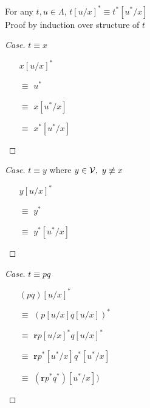 \begin{prop}
  For any $t, u\in\Lambda$, $t[u/x]^* \equiv t^*[u^*/x]$\\
  Proof by induction over structure of $t$
  \begin{proof}[Case]
    $t\equiv x$
    \begin{itemize}
      \item[\phantom{$\equiv$}] $x[u/x]^*$

      \item[$\equiv$] $u^*$

        \item[$\equiv$] $x[u^*/x]$

        \item[$\equiv$] $x^*[u^*/x]$
          \marginnote{\Def-$(-)^*$}
          \qedhere
    \end{itemize}
  \end{proof}

  \begin{proof}[Case]
    $t\equiv y$ where $y\in\mathcal{V},~y\not\equiv x$
    \begin{itemize}
      \item[\phantom{$\equiv$}] $y[u/x]^*$
      \item[$\equiv$] $y^*$
      \item[$\equiv$] $y^*[u^*/x]$
          \qedhere
    \end{itemize}
  \end{proof}

  \begin{proof}[Case]
    $t\equiv pq$
    \begin{itemize}
      \item[\phantom{$\equiv$}] $(pq)[u/x]^*$

      \item[$\equiv$] $(p[u/x]q[u/x])^*$

      \item[$\equiv$] $\mathbf{r}p[u/x]^*q[u/x]^*$
          \marginnote{\Def-$(-)^*$}

      \item[$\equiv$] $\mathbf{r}p^*[u^*/x]q^*[u^*/x]$

      \item[$\equiv$] $(\mathbf{r}p^*q^*)[u^*/x])$


\end{itemize}
\end{proof}
\end{prop}
